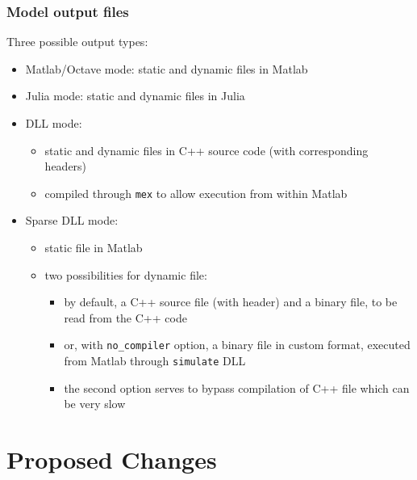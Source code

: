 \documentclass{beamer}
\begin{document}
\begin{frame}
  \frametitle{Model output files}
  Three possible output types:
  \begin{itemize}
  \item Matlab/Octave mode: static and dynamic files in Matlab
  \item Julia mode: static and dynamic files in Julia
  \item DLL mode:
    \begin{itemize}
    \item static and dynamic files in C++ source code (with corresponding headers)
    \item compiled through \texttt{mex} to allow execution from within Matlab
    \end{itemize}
  \item Sparse DLL mode:
    \begin{itemize}
    \item static file in Matlab
    \item two possibilities for dynamic file:
      \begin{itemize}
      \item by default, a C++ source file (with header) and a binary file, to be read from the C++ code
      \item or, with \texttt{no\_compiler} option, a binary file in custom format, executed from Matlab through \texttt{simulate} DLL
      \item the second option serves to bypass compilation of C++ file which can be very slow
      \end{itemize}
    \end{itemize}
  \end{itemize}
\end{frame}

\section{Proposed Changes}
\end{document}
